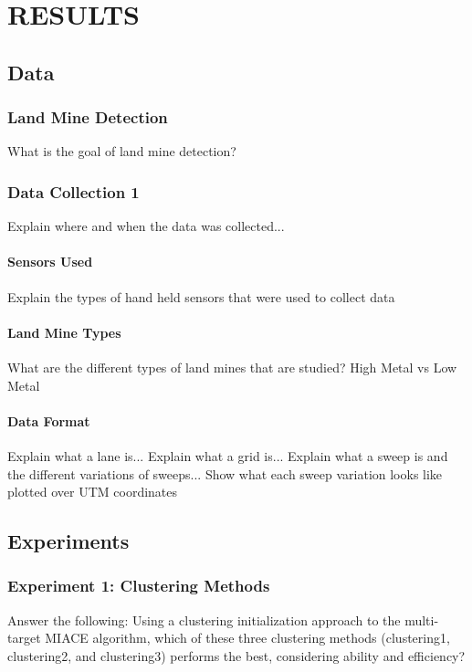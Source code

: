 \chapter{RESULTS} \label{results}

\section{Data}

\subsection{Land Mine Detection}
What is the goal of land mine detection?

\subsection{Data Collection 1}
Explain where and when the data was collected...\newline

\subsubsection{Sensors Used}
Explain the types of hand held sensors that were used to collect data

\subsubsection{Land Mine Types}
What are the different types of land mines that are studied?\newline
High Metal vs Low Metal

\subsubsection{Data Format}
Explain what a lane is...\newline
Explain what a grid is...\newline
Explain what a sweep is and the different variations of sweeps...\newline
Show what each sweep variation looks like plotted over UTM coordinates




\section{Experiments}

\subsection{Experiment 1: Clustering Methods}
Answer the following: Using a clustering initialization approach to the multi-target MIACE algorithm, which of these three clustering methods (clustering1, clustering2, and clustering3) performs the best, considering ability and efficiency?

